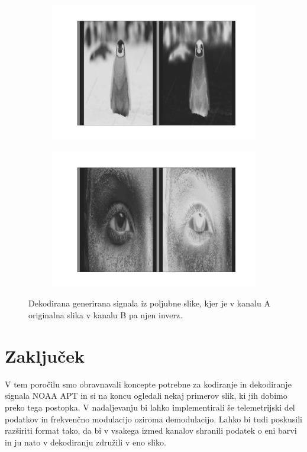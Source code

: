 \documentclass{article}
\begin{document}
\begin{figure}[H]
    \centering
    \begin{subfigure}[b]{0.49\textwidth}
        \centering
        \includegraphics[width=\textwidth]{penguin.pdf}
    \end{subfigure}
    \hfill
    \begin{subfigure}[b]{0.49\textwidth}
        \centering
        \includegraphics[width=\textwidth]{eye.pdf}
    \end{subfigure}
	\caption{Dekodirana generirana signala iz poljubne slike, kjer je v kanalu A originalna slika v kanalu B pa njen inverz.}
    \label{fig:out_example}
\end{figure}
\section{Zaključek}
V tem poročilu smo obravnavali koncepte potrebne za kodiranje in dekodiranje signala NOAA APT in si na koncu ogledali nekaj primerov slik, ki jih dobimo preko tega postopka. V nadaljevanju bi lahko implementirali še telemetrijski del podatkov in frekvenčno modulacijo oziroma demodulacijo. Lahko bi tudi poskusili razširiti format tako, da bi v vsakega izmed kanalov shranili podatek o eni barvi in ju nato v dekodiranju združili v eno sliko.


\printbibliography[heading=bibnumbered]
\end{document}
